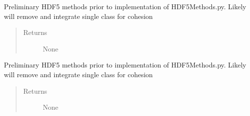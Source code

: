 \documentclass[letterpaper,10pt,english]{sphinxmanual}
\begin{document}
\begin{fulllineitems}
\begin{fulllineitems}
\begin{quote}
\begin{description}
\end{description}\end{quote}

\end{fulllineitems}


\begin{fulllineitems}
\label{\detokenize{index:droogCNC.HDF5File.createGroup}}
\sphinxAtStartPar
Preliminary HDF5 methods prior to implementation of HDF5Methods.py. Likely will remove and integrate single
class for cohesion
\begin{quote}\begin{description}
\item[{Returns}] \leavevmode
\sphinxAtStartPar
None

\end{description}\end{quote}

\end{fulllineitems}


\begin{fulllineitems}
\label{\detokenize{index:droogCNC.HDF5File.setMetadata}}
\sphinxAtStartPar
Preliminary HDF5 methods prior to implementation of HDF5Methods.py. Likely will remove and integrate single
class for cohesion
\begin{quote}\begin{description}
\item[{Returns}] \leavevmode
\sphinxAtStartPar
None

\end{description}\end{quote}

\end{fulllineitems}


\end{fulllineitems}

\end{document}
